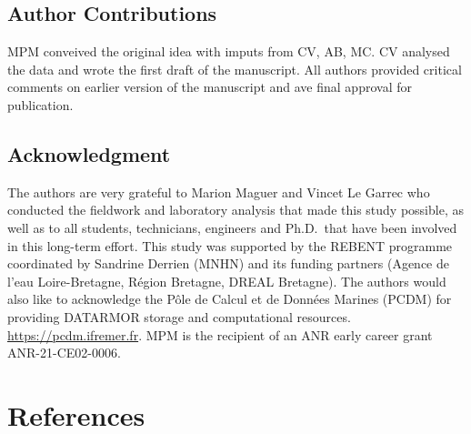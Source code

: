 \documentclass[9pt,biorxiv,doublespacing,lineno]{lapreprint}
\begin{document}
\hypertarget{author-contributions}{%
\subsection{Author Contributions}\label{author-contributions}}

MPM conveived the original idea with imputs from CV, AB, MC. CV analysed
the data and wrote the first draft of the manuscript. All authors
provided critical comments on earlier version of the manuscript and ave
final approval for publication.

\hypertarget{acknowledgment}{%
\subsection{Acknowledgment}\label{acknowledgment}}

The authors are very grateful to Marion Maguer and Vincet Le Garrec who
conducted the fieldwork and laboratory analysis that made this study
possible, as well as to all students, technicians, engineers and
Ph.D.~that have been involved in this long-term effort. This study was
supported by the REBENT programme coordinated by Sandrine Derrien (MNHN)
and its funding partners (Agence de l'eau Loire-Bretagne, Région
Bretagne, DREAL Bretagne). The authors would also like to acknowledge
the Pôle de Calcul et de Données Marines (PCDM) for providing DATARMOR
storage and computational resources. \url{https://pcdm.ifremer.fr}. MPM
is the recipient of an ANR early career grant ANR-21-CE02-0006.

\hypertarget{references}{%
\section*{References}\label{references}}
\end{document}
